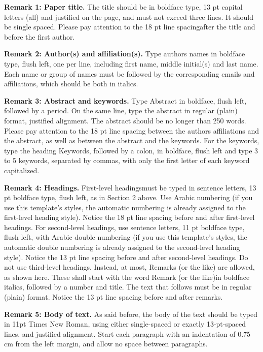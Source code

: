 \documentclass{cilamce19}
\begin{document}
\textbf{Remark 1: Paper title.} The title should be in boldface type, 13 pt capital letters (all) and justified on the page, and must not exceed three lines. It should be single spaced. Please pay attention to the 18 pt line spacingafter the title and before the first author.

\textbf{Remark 2: Author(s) and affiliation(s).} Type authors names in boldface type, flush left, one per line, including first name, middle initial(s) and last name. Each name or group of names must be followed by the corresponding emails and affiliations, which should be both in italics.

\textbf{Remark 3: Abstract and keywords.} Type Abstract in boldface, flush left, followed by a period. On the same line, type the abstract in regular (plain) format, justified alignment. The abstract should be no longer than 250 words. Please pay attention to the 18 pt line spacing between the authors affiliations and the abstract, as well as between the abstract and the keywords. For the keywords, type the heading Keywords, followed by a colon, in boldface, flush left and type 3 to 5 keywords, separated by commas, with only the first letter of each keyword capitalized.

\textbf{Remark 4: Headings.} First-level headingsmust be typed in sentence letters, 13 pt boldface type, flush left, as in Section 2 above. Use Arabic numbering (if you use this template's styles, the automatic numbering is already assigned to the first-level heading style). Notice the 18 pt line spacing before and after first-level headings. For second-level headings, use sentence letters, 11 pt boldface type, flush left, with Arabic double numbering (if you use this template's styles, the automatic double numbering is already assigned to the second-level heading style). Notice the 13 pt line spacing before and after second-level headings. Do not use third-level headings. Instead, at most, Remarks (or the like) are allowed, as shown here. These shall start with the word Remark (or the like)in boldface italics, followed by a number and title. The text that follows must be in regular (plain) format. Notice the 13 pt line spacing before and after remarks.

\textbf{Remark 5: Body of text.} As said before, the body of the text should be typed in 11pt Times New Roman, using either single-spaced or exactly 13-pt-spaced lines, and justified alignment. Start each paragraph with an indentation of 0.75 cm from the left margin, and allow no space between paragraphs. 
\end{document}
